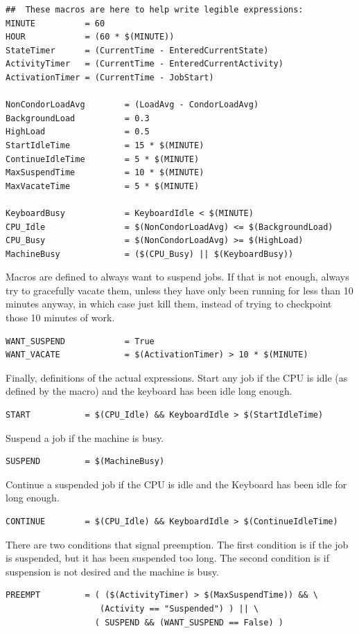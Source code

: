 \begin{verbatim}
##  These macros are here to help write legible expressions:
MINUTE          = 60
HOUR            = (60 * $(MINUTE))
StateTimer      = (CurrentTime - EnteredCurrentState)
ActivityTimer   = (CurrentTime - EnteredCurrentActivity)
ActivationTimer = (CurrentTime - JobStart)

NonCondorLoadAvg        = (LoadAvg - CondorLoadAvg)
BackgroundLoad          = 0.3
HighLoad                = 0.5
StartIdleTime           = 15 * $(MINUTE)
ContinueIdleTime        = 5 * $(MINUTE)
MaxSuspendTime          = 10 * $(MINUTE)
MaxVacateTime           = 5 * $(MINUTE)

KeyboardBusy            = KeyboardIdle < $(MINUTE)
CPU_Idle                = $(NonCondorLoadAvg) <= $(BackgroundLoad)
CPU_Busy                = $(NonCondorLoadAvg) >= $(HighLoad)
MachineBusy             = ($(CPU_Busy) || $(KeyboardBusy))
\end{verbatim}

Macros are defined to always want to suspend jobs.
If that is not enough, always try to gracefully vacate them,
unless they have only been running for less than 10 minutes anyway, in
which case just kill them, instead of trying to checkpoint those
10 minutes of work.
\begin{verbatim}
WANT_SUSPEND            = True
WANT_VACATE             = $(ActivationTimer) > 10 * $(MINUTE)
\end{verbatim}

Finally, definitions of the actual expressions.
Start any job if the CPU is idle (as defined by the macro)
and the keyboard has been idle long enough.
\begin{verbatim}
START           = $(CPU_Idle) && KeyboardIdle > $(StartIdleTime)
\end{verbatim}

Suspend a job if the machine is busy.
\begin{verbatim}
SUSPEND         = $(MachineBusy)
\end{verbatim}

Continue a suspended job if the CPU is idle and the Keyboard has been
idle for long enough.
\begin{verbatim}
CONTINUE        = $(CPU_Idle) && KeyboardIdle > $(ContinueIdleTime)
\end{verbatim}

There are two conditions that signal preemption.
The first condition is if the job is suspended,
but it has been suspended too long.
The second condition is if suspension is not desired and the machine is busy. 
\begin{verbatim}
PREEMPT	        = ( ($(ActivityTimer) > $(MaxSuspendTime)) && \
                   (Activity == "Suspended") ) || \
                  ( SUSPEND && (WANT_SUSPEND == False) )
\end{verbatim}

